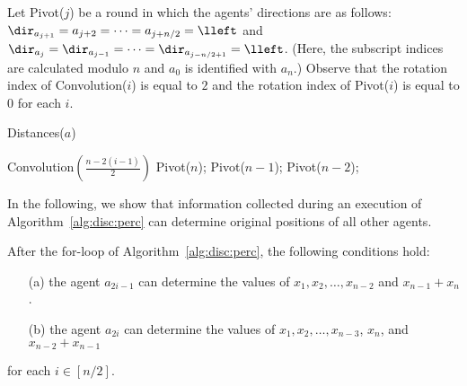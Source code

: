 Let Pivot($j$) be a round in which the agents' directions are as follows:
$\dir_{a_{j+1}}=a_{j+2}=\cdots=a_{j+n/2}=\lleft$ and
$\dir_{a_{j}}=\dir_{a_{j-1}}=\cdots=\dir_{a_{j-n/2+1}}=\lleft$.
(Here, the subscript indices are calculated modulo $n$ and $a_0$ is identified
with $a_n$.)
Observe that the rotation index of Convolution($i$) is equal to $2$ and the rotation
index of Pivot($i$) is equal to $0$ for each $i$.
\begin{algorithm}[]
	\caption{Distances($a$)}
	\label{alg:disc:perc}
	\begin{algorithmic}[1]
        \State Convolution$(\frac{n-2(i-1)}{2})$
    \EndFor
    \State Pivot($n$); Pivot($n-1$); Pivot($n-2$);
    \end{algorithmic}
\end{algorithm}
In the following, we show that information collected during an
execution of Algorithm~\ref{alg:disc:perc} can determine original
positions of all other agents. 
\begin{proposition}\label{prop:linear}
After the for-loop of Algorithm~\ref{alg:disc:perc}, the following
conditions hold:
\begin{enumerate}
\item[(a)]
the agent $a_{2i-1}$ can
determine the values of
$x_{1}, x_2, \ldots,x_{n-2}$ and $x_{n-1}+x_n$.
\item[(b)]
the agent $a_{2i}$ can determine the values of
$x_1,x_2,\ldots,x_{n-3}$, $x_n$, and $x_{n-2}+x_{n-1}$
\end{enumerate}
for each $i\in[n/2]$.
\end{proposition}
\iffull
